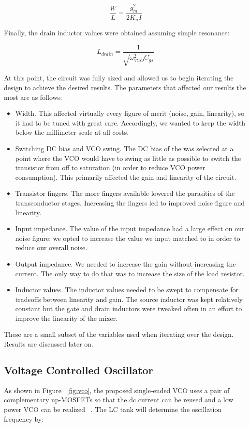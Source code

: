\begin{equation}
\frac{W}{L} = \frac{g_{m}^2}{2K_{n}I}
\end{equation}

Finally, the drain inductor values were obtained assuming simple resonance:

\begin{equation}
L_{drain} = \frac{1}{\sqrt{\omega^{2}_{VCO}C_{gs}}}
\end{equation}

At this point, the circuit was fully sized and allowed us to begin iterating the design to achieve the desired results.
The parameters that affected our results the most are as follows:

\begin{itemize}
	\item Width. This affected virtually every figure of merit (noise, gain, linearity), so it had to be tuned with great care. Accordingly, we wanted to keep the width below the millimeter scale at all costs.
	\item Switching DC bias and VCO swing. The DC bias of the was selected at a point where the VCO would have to swing as little as possible to switch the transistor from off to saturation (in order to reduce VCO power consumption). This primarily affected the gain and linearity of the circuit.
	\item Transistor fingers. The more fingers available lowered the parasitics of the transconductor stages. Increasing the fingers led to improved noise figure and linearity.
	\item Input impedance. The value of the input impedance had a large effect on our noise figure; we opted to increase the value we input matched to in order to reduce our overall noise.
	\item Output impedance. We needed to increase the gain without increasing the current. The only way to do that was to increase the size of the load resistor.
	\item Inductor values. The inductor values needed to be swept to compensate for tradeoffs between linearity and gain. The source inductor was kept relatively constant but the gate and drain inductors were tweaked often in an effort to improve the linearity of the mixer.
\end{itemize}

These are a small subset of the variables used when iterating over the design. Results are discussed later on.

\subsection{Voltage Controlled Oscillator}
As shown in Figure ~\ref{fig:vco}, the proposed single-ended VCO uses a pair of complementary np-MOSFETs so that the dc current can be reused and a low power VCO can be realized ~\cite{vco}. The LC tank will determine the oscillation frequency by:

